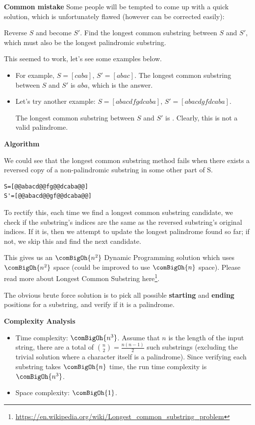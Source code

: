 \noindent{}\textbf{Common mistake}
Some people will be tempted to come up with a quick solution, which is
unfortunately flawed (however can be corrected easily):
\begin{mdframed}[style=mdfNOTE]
Reverse $S$ and become $S'$. Find the longest common substring between $S$
and $S'$, which must also be the longest palindromic substring.
\end{mdframed}
This seemed to work, let's see some examples below.
\begin{itemize}%
\item For example, $S=[caba]$, $S'=[abac]$. The longest common substring
  between $S$ and $S'$ is $aba$, which is the answer.
\item Let's try another example: $S=[abacdfgdcaba]$, $S'=[abacdgfdcaba]$.

The longest common substring between $S$ and $S'$ is . Clearly,
this is not a valid palindrome.
\end{itemize}

\noindent{}\textbf{Algorithm}

We could see that the longest common substring method fails when there
exists a reversed copy of a non-palindromic substring in some other part of
S. 
\begin{lstlisting}[style=raygeneric]
 S=[@@abacd@@fg@@dcaba@@]
S'=[@@abacd@@gf@@dcaba@@]
\end{lstlisting}
To rectify this, each time we find a longest common substring candidate, we
check if the substring's indices are the same as the reversed substring's
original indices. If it is, then we attempt to update the longest palindrome
found so far; if not, we skip this and find the next candidate.

This gives us an $\comBigOh{n^2}$ Dynamic Programming solution which uses
$\comBigOh{n^2}$ space (could be improved to use $\comBigOh{n}$ space).
Please read more about Longest Common Substring
here\footnote{\url{https://en.wikipedia.org/wiki/Longest\_common\_substring\_problem}}.



The obvious brute force solution is to pick all possible \textbf{starting}
and \textbf{ending} positions for a substring, and verify if it is a
palindrome.

\noindent{}\textbf{Complexity Analysis}
\begin{itemize}%
\item Time complexity: $\comBigOh{n^3}$. Assume that $n$ is the length of
  the input string, there are a total of $\binom{n}{2}=\frac{n(n-1)}{2}$
  such substrings (excluding the trivial solution where a character itself
  is a palindrome). Since verifying each substring takes $\comBigOh{n}$
  time, the run time complexity is $\comBigOh{n^3}$.
\item Space complexity: $\comBigOh{1}$.
\end{itemize}

